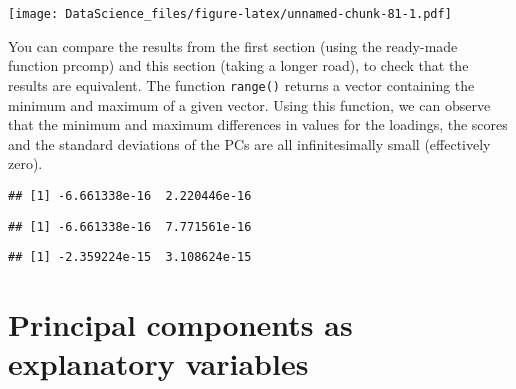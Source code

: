 \documentclass[
]{book}
\newenvironment{Shaded}{\begin{snugshade}}{\end{snugshade}}
\newcommand{\FunctionTok}[1]{\textcolor[rgb]{0.00,0.00,0.00}{#1}}
\newcommand{\NormalTok}[1]{#1}
\newcommand{\SpecialCharTok}[1]{\textcolor[rgb]{0.00,0.00,0.00}{#1}}
\begin{document}
\texttt{[image: DataScience\_files/figure-latex/unnamed-chunk-81-1.pdf]}

You can compare the results from the first section (using the ready-made function prcomp) and this section (taking a longer road), to check that the results are equivalent. The function \texttt{range()} returns a vector containing the minimum and maximum of a given vector. Using this function, we can observe that the minimum and maximum differences in values for the loadings, the scores and the standard deviations of the PCs are all infinitesimally small (effectively zero).

\begin{Shaded}
\end{Shaded}

\begin{verbatim}
## [1] -6.661338e-16  2.220446e-16
\end{verbatim}

\begin{Shaded}
\end{Shaded}

\begin{verbatim}
## [1] -6.661338e-16  7.771561e-16
\end{verbatim}

\begin{Shaded}
\end{Shaded}

\begin{verbatim}
## [1] -2.359224e-15  3.108624e-15
\end{verbatim}

\hypertarget{principal-components-as-explanatory-variables}{%
\section{Principal components as explanatory variables}\label{principal-components-as-explanatory-variables}}
\end{document}
